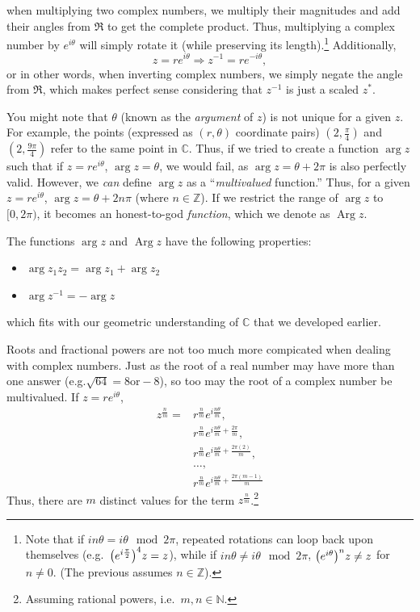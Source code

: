 \documentclass[10pt]{scrartcl}
\numberwithin{equation}{subsection}
\theoremstyle{definition}
\theoremstyle{remark}
\newcommand{\Complex}{\mathbb{C}}
\newcommand{\Integers}{\mathbb{Z}}
\newcommand{\inv}[1]{
		{#1}^{-1}
	}
\newcommand*{\conj}[1]{{#1}^*}
\DeclareMathOperator{\Arg}{Arg}
\begin{document}
when multiplying two complex numbers, we multiply their magnitudes and 
add their angles from $\Re$ to get the complete product. Thus, multiplying
a complex number by $e^{i\theta}$ will simply rotate it (while preserving its
length).\footnote{Note that if $in\theta = i\theta \mod 2\pi$, repeated
rotations can loop back upon themselves (e.g.\ $\pqty{e^{i\frac{\pi}{2}}}^4 z =
z$), while if $in\theta \neq i\theta \mod 2\pi$, $\pqty{e^{i\theta}}^n z\neq z$
for $n\neq0$. (The previous assumes $n\in\mathbb{Z}$).} Additionally,
\[z=re^{i\theta} \Rightarrow \inv{z} = re^{-i\theta},\]
or in other words, when inverting complex numbers, we simply negate the angle
from $\Re$, which makes perfect sense considering that $\inv{z}$ is just a
scaled $\conj{z}$. 

You might note that $\theta$ (known as the \textit{argument} of $z$)
is not unique for a given $z$. For example,
the points (expressed as $(r,\theta)$ coordinate pairs)
$(2, \frac{\pi}{4})$ and $(2, \frac{9\pi}{4})$ refer to the same point in 
$\Complex$. Thus, if we tried to create a function $\arg{z}$ such that
if $z=re^{i \theta}$, $\arg{z} = \theta$,
we would fail, as $\arg{z} = \theta + 2 \pi$ 
is also perfectly valid.
However, we \emph{can} define $\arg{z}$ as a ``\textit{multivalued}
function.''
Thus, for a given $z=re^{i\theta}$, $\arg{z} = \theta + 2n\pi$
(where $n \in \Integers$).
If we restrict the range of $\arg{z}$ to $[0, 2\pi)$, 
it becomes an honest-to-god \emph{function}, which we denote as $\Arg{z}$.

The functions $\arg{z}$ and $\Arg{z}$ have the following properties:
\begin{itemize}
	\item $\arg{z_1 z_2} = \arg{z_1} + \arg{z_2}$
	\item $\arg{\inv{z}} = - \arg{z}$
\end{itemize}
which fits with our geometric understanding of $\Complex$ that we developed 
earlier.

Roots and fractional powers are not too much more compicated when dealing with 
complex numbers. Just as the root of a real number may have more
than one answer (e.g.$\sqrt{64} = 8 \text{or} -8$), so too may the root of a 
complex number be multivalued. If $z = re^{i\theta}$,
\begin{align*}
	z^\frac{n}{m} = &r^\frac{n}{m} e^{i\frac{n\theta}{m}},\\ 
					&r^\frac{n}{m} e^{i\frac{n\theta}{m} + \frac{2\pi}{m}},\\ 
					&r^\frac{n}{m}e^{i\frac{n\theta}{m} + \frac{2\pi(2)}{m}},\\ 
					&\ldots,\\
					&r^\frac{n}{m} e^{i\frac{n\theta}{m} + \frac{2\pi(m-1)}{m}}
\end{align*}
Thus, there are $m$ distinct values for the term $z^\frac{n}{m}$.\footnote{Assuming
rational powers, i.e.\ $m,n \in \mathbb{N}$.}
\end{document}
